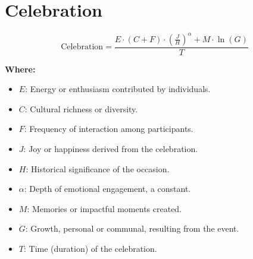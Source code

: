 \chapter{Celebration}

\begin{equation}
\text{Celebration} = \frac{E \cdot (C + F) \cdot \left( \frac{J}{H} \right)^\alpha + M \cdot \ln(G)}{T}
\end{equation}

\textbf{Where:}

\begin{itemize}
    \item $E$: Energy or enthusiasm contributed by individuals.
    \item $C$: Cultural richness or diversity.
    \item $F$: Frequency of interaction among participants.
    \item $J$: Joy or happiness derived from the celebration.
    \item $H$: Historical significance of the occasion.
    \item $\alpha$: Depth of emotional engagement, a constant.
    \item $M$: Memories or impactful moments created.
    \item $G$: Growth, personal or communal, resulting from the event.
    \item $T$: Time (duration) of the celebration.
\end{itemize}